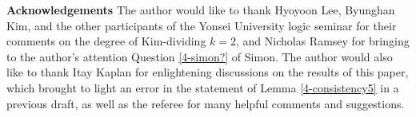 \documentclass[12pt]{amsart}
\theoremstyle{definition}
\begin{document}
\:

\textbf{Acknowledgements} The author would like to thank Hyoyoon Lee, Byunghan Kim, and the other participants of the Yonsei University logic seminar for their comments on the degree of Kim-dividing $k=2$, and Nicholas Ramsey for bringing to the author's attention Question \ref{4-simon?} of Simon. The author would also like to thank Itay Kaplan for enlightening discussions on the results of this paper, which brought to light an error in the statement of Lemma \ref{4-consistency5} in a previous draft, as well as the referee for many helpful comments and suggestions.





\end{document}
